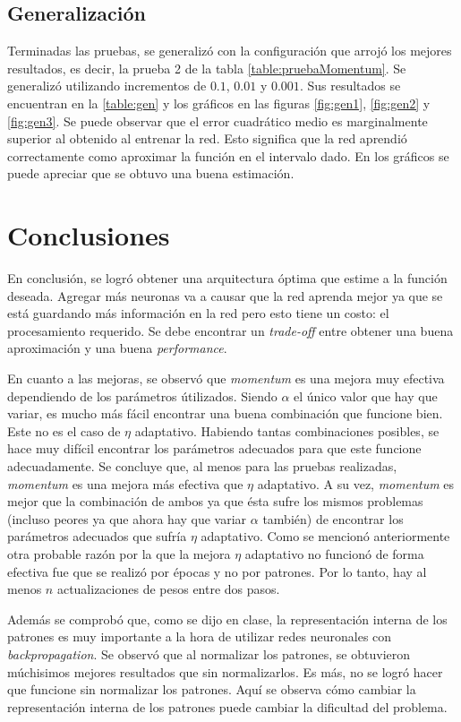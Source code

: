 \documentclass[11pt,a4paper]{article}
\begin{document}
\subsection{Generalización}

Terminadas las pruebas, se generalizó con la configuración que arrojó los mejores resultados, es decir, la prueba 2 de la tabla \ref{table:pruebaMomentum}. Se generalizó utilizando incrementos de $0.1$, $0.01$ y $0.001$. Sus resultados se encuentran en la \ref{table:gen} y los gráficos en las figuras \ref{fig:gen1}, \ref{fig:gen2} y \ref{fig:gen3}. Se puede observar que el error cuadrático medio es marginalmente superior al obtenido al entrenar la red. Esto significa que la red aprendió correctamente como aproximar la función en el intervalo dado. En los gráficos se puede apreciar que se obtuvo una buena estimación. 

\section{Conclusiones}

En conclusión, se logró obtener una arquitectura óptima que estime a la función deseada. Agregar más neuronas va a causar que la red aprenda mejor ya que se está guardando más información en la red pero esto tiene un costo: el procesamiento requerido. Se debe encontrar un \emph{trade-off} entre obtener una buena aproximación y una buena \emph{performance}.

En cuanto a las mejoras, se observó que \emph{momentum} es una mejora muy efectiva dependiendo de los parámetros útilizados. Siendo $\alpha$ el único valor que hay que variar, es mucho más fácil encontrar una buena combinación que funcione bien. Este no es el caso de $\eta$ adaptativo. Habiendo tantas combinaciones posibles, se hace muy difícil encontrar los parámetros adecuados para que este funcione adecuadamente. Se concluye que, al menos para las pruebas realizadas, \emph{momentum} es una mejora más efectiva que $\eta$ adaptativo. A su vez, \emph{momentum} es mejor que la combinación de ambos ya que ésta sufre los mismos problemas (incluso peores ya que ahora hay que variar $\alpha$ también) de encontrar los parámetros adecuados que sufría $\eta$ adaptativo. Como se mencionó anteriormente otra probable razón por la que la mejora $\eta$ adaptativo no funcionó de forma efectiva fue que se realizó por épocas y no por patrones. Por lo tanto, hay al menos $n$ actualizaciones de pesos entre dos pasos.

Además se comprobó que, como se dijo en clase, la representación interna de los patrones es muy importante a la hora de utilizar redes neuronales con \emph{backpropagation}. Se observó que al normalizar los patrones, se obtuvieron múchisimos mejores resultados que sin normalizarlos. Es más, no se logró hacer que funcione sin normalizar los patrones. Aquí se observa cómo cambiar la representación interna de los patrones puede cambiar la dificultad del problema.
\end{document}
